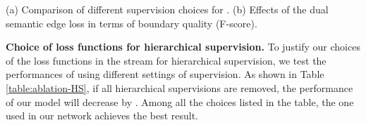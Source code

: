 \documentclass[runningheads]{llncs}
\begin{document}
\begin{table}[h]
\caption{(a) Comparison of different supervision choices for \SemEdgeD. (b) Effect{s} of the dual semantic edge loss in terms of boundary quality (F-score).}
    \begin{subtable}[t]{0.6\textwidth}
        \caption{}
        \centering
       \label{table:ablation-HS}
    \end{subtable}
    \hfill
    \begin{subtable}[t]{0.38\textwidth}
        \caption{}
        \centering
        \label{table:ablation-DL}
     \end{subtable}
     \label{tab:temps}
\end{table}








\smallskip \noindent \textbf{Choice of loss functions for hierarchical supervision.}
To justify our choices of {the} loss functions in {the} {\SemEdgeD} stream for hierarchical supervision, we test the performances of {\SemEdgeD} using different settings of supervision. As shown in Table \ref{table:ablation-HS}, if all hierarchical supervisions are removed, the performance of our {\SemEdgeD} model will decrease by . Among all the choices listed in the table, the one used in our network achieves the best result.
\end{document}
